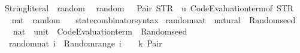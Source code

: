 \begin{isabellebody}
%
\endisatagproof
{\isafoldproof}%
%
\isadelimproof
%
\endisadelimproof
\isanewline
\isanewline
{}\isamarkupfalse%
\isanewline
\isanewline
{}\isamarkupfalse%
\isanewline
\isanewline
{}\isamarkupfalse%
\ String{\isachardot}{\kern0pt}literal\ {\isacharcolon}{\kern0pt}{\isacharcolon}{\kern0pt}\ random\isanewline
{}\isanewline
\isanewline
{}\isamarkupfalse%
\isanewline
\ \ {\isachardoublequoteopen}random\ {\isacharunderscore}{\kern0pt}\ {\isacharequal}{\kern0pt}\ Pair\ {\isacharparenleft}{\kern0pt}STR\ {\isacharprime}{\kern0pt}{\isacharprime}{\kern0pt}{\isacharprime}{\kern0pt}{\isacharprime}{\kern0pt}{\isacharcomma}{\kern0pt}\ {\isasymlambda}u{\isachardot}{\kern0pt}\ Code{\isacharunderscore}{\kern0pt}Evaluation{\isachardot}{\kern0pt}term{\isacharunderscore}{\kern0pt}of\ {\isacharparenleft}{\kern0pt}STR\ {\isacharprime}{\kern0pt}{\isacharprime}{\kern0pt}{\isacharprime}{\kern0pt}{\isacharprime}{\kern0pt}{\isacharparenright}{\kern0pt}{\isacharparenright}{\kern0pt}{\isachardoublequoteclose}\isanewline
\isanewline
{}\isamarkupfalse%
%
\isadelimproof
\ %
\endisadelimproof
%
\isatagproof
\isacommand{{\isachardot}{\kern0pt}{\isachardot}{\kern0pt}}\isamarkupfalse%
%
\endisatagproof
{\isafoldproof}%
%
\isadelimproof
%
\endisadelimproof
\isanewline
\isanewline
{}\isamarkupfalse%
\isanewline
\isanewline
{}\isamarkupfalse%
\ nat\ {\isacharcolon}{\kern0pt}{\isacharcolon}{\kern0pt}\ random\isanewline
{}\isanewline
\isanewline
{}\isamarkupfalse%
\isanewline
\ \ \ state{\isacharunderscore}{\kern0pt}combinator{\isacharunderscore}{\kern0pt}syntax\isanewline
{}\isanewline
\isanewline
{}\isamarkupfalse%
\ random{\isacharunderscore}{\kern0pt}nat\ {\isacharcolon}{\kern0pt}{\isacharcolon}{\kern0pt}\ {\isachardoublequoteopen}natural\ {\isasymRightarrow}\ Random{\isachardot}{\kern0pt}seed\isanewline
\ \ {\isasymRightarrow}\ {\isacharparenleft}{\kern0pt}nat\ {\isasymtimes}\ {\isacharparenleft}{\kern0pt}unit\ {\isasymRightarrow}\ Code{\isacharunderscore}{\kern0pt}Evaluation{\isachardot}{\kern0pt}term{\isacharparenright}{\kern0pt}{\isacharparenright}{\kern0pt}\ {\isasymtimes}\ Random{\isachardot}{\kern0pt}seed{\isachardoublequoteclose}\isanewline
{}\isanewline
\ \ {\isachardoublequoteopen}random{\isacharunderscore}{\kern0pt}nat\ i\ {\isacharequal}{\kern0pt}\ Random{\isachardot}{\kern0pt}range\ {\isacharparenleft}{\kern0pt}i\ {\isacharplus}{\kern0pt}\ {}{\isacharparenright}{\kern0pt}\ {\isasymcirc}{\isasymrightarrow}\ {\isacharparenleft}{\kern0pt}{\isasymlambda}k{\isachardot}{\kern0pt}\ Pair\ {\isacharparenleft}{\kern0pt}\isanewline

\end{isabellebody}
